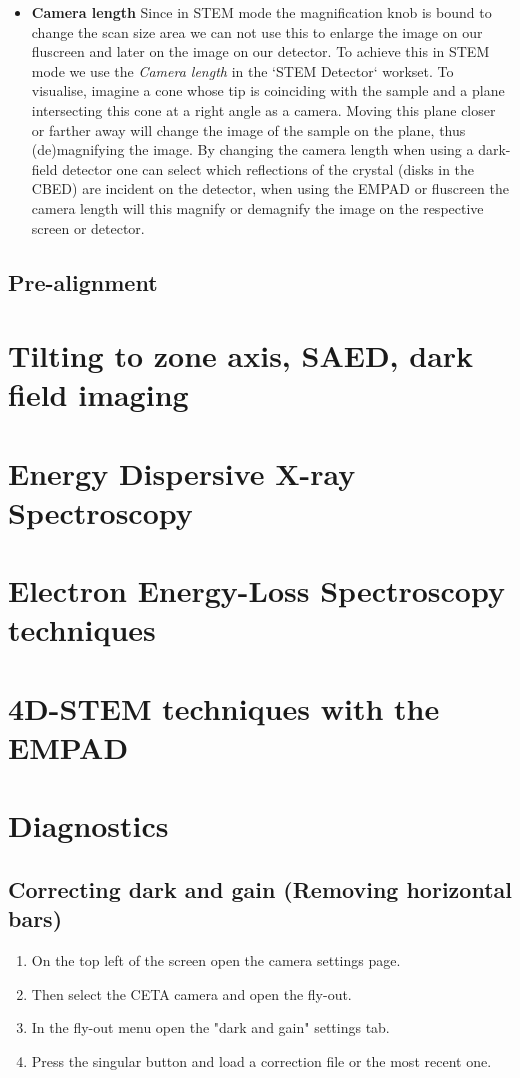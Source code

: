 \documentclass[a4paper]{scrartcl}
\begin{document}
\begin{itemize}
	\item{\textbf{Camera length}
		Since in STEM mode the magnification knob is bound to change the scan size area we can not use this to enlarge the image on our fluscreen and later on the image on our detector. To achieve this in STEM mode we use the \textit{Camera length} in the `STEM Detector` workset. To visualise, imagine a cone whose tip is coinciding with the sample and a plane intersecting this cone at a right angle as a camera. Moving this plane closer or farther away will change the image of the sample on the plane, thus (de)magnifying the image. By changing the camera length when using a dark-field detector one can select which reflections of the crystal (disks in the CBED) are incident on the detector, when using the EMPAD or fluscreen the camera length will this magnify or demagnify the image on the respective screen or detector.}
\end{itemize}

\subsection*{Pre-alignment}

\section*{Tilting to zone axis, SAED, dark field imaging}

\section*{Energy Dispersive X-ray Spectroscopy}

\section*{Electron Energy-Loss Spectroscopy techniques}

\section*{4D-STEM techniques with the EMPAD}

\section*{Diagnostics}
\subsection*{Correcting dark and gain (Removing horizontal bars)}
\begin{enumerate}
	\item On the top left of the screen open the camera settings page.
	\item Then select the CETA camera and open the fly-out.
	\item In the fly-out menu open the "dark and gain" settings tab.
	\item Press the singular button and load a correction file or the most recent one.
\end{enumerate}
\end{document}

